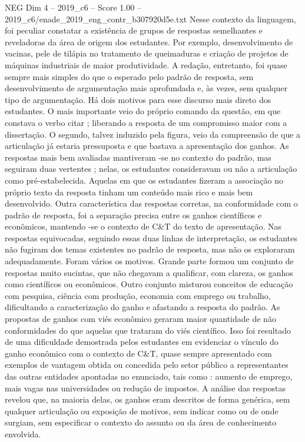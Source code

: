 \begin{textsample}{NEG Dim 4 – 2019\_c6 – Score 1.00 – 2019\_c6/enade\_2019\_eng\_contr\_b307920d5e.txt}
Nesse contexto da linguagem, foi peculiar constatar a existência de grupos de respostas semelhantes e reveladoras da área de origem dos estudantes.
Por exemplo, desenvolvimento de vacinas, pele de tilápia no tratamento de queimaduras e criação de projetos de máquinas industriais de maior produtividade.
A redação, entretanto, foi quase sempre mais simples do que o esperado pelo padrão de resposta, sem desenvolvimento de argumentação mais aprofundada e, às vezes, sem qualquer tipo de argumentação.
Há dois motivos para esse discurso mais direto dos estudantes.
O mais importante veio do próprio comando da questão, em que constava o verbo citar ; liberando a resposta de um compromisso maior com a dissertação.
O segundo, talvez induzido pela figura, veio da compreensão de que a articulação já estaria pressuposta e que bastava a apresentação dos ganhos.
As respostas mais bem avaliadas mantiveram -se no contexto do padrão, mas seguiram duas vertentes ; nelas, os estudantes consideravam ou não a articulação como pré-estabelecida.
Aquelas em que os estudantes fizeram a associação no próprio texto da resposta tinham um conteúdo mais rico e mais bem desenvolvido.
Outra característica das respostas corretas, na conformidade com o padrão de resposta, foi a separação precisa entre os ganhos científicos e econômicos, mantendo -se o contexto de C\&T do texto de apresentação.
Nas respostas equivocadas, seguindo essas duas linhas de interpretação, os estudantes não fugiram dos temas existentes no padrão de resposta, mas não os exploraram adequadamente.
Foram vários os motivos.
Grande parte formou um conjunto de respostas muito sucintas, que não chegavam a qualificar, com clareza, os ganhos como científicos ou econômicos.
Outro conjunto misturou conceitos de educação com pesquisa, ciência com produção, economia com emprego ou trabalho, dificultando a caracterização do ganho e afastando a resposta do padrão.
As propostas de ganhos com viés econômico geraram maior quantidade de não conformidades do que aquelas que trataram do viés científico.
Isso foi resultado de uma dificuldade demostrada pelos estudantes em evidenciar o vínculo do ganho econômico com o contexto de C\&T, quase sempre apresentado com exemplos de vantagem obtida ou concedida pelo setor público a representantes das outras entidades apontadas no enunciado, tais como : aumento de emprego, mais vagas nas universidades ou redução de impostos.
A análise das respostas revelou que, na maioria delas, os ganhos eram descritos de forma genérica, sem qualquer articulação ou exposição de motivos, sem indicar como ou de onde surgiam, sem especificar o contexto do assunto ou da área de conhecimento envolvida.

\end{textsample}
